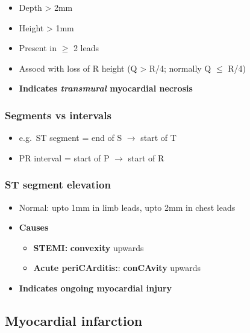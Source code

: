 \documentclass[
  12pt,
]{memoir}
\providecommand{\tightlist}{%
  \setlength{\itemsep}{0pt}\setlength{\parskip}{0pt}}
\begin{document}
\begin{itemize}
\tightlist
\item
  Depth \textgreater{} 2mm
\item
  Height \textgreater{} 1mm
\item
  Present in \(\ge\) 2 leads
\item
  Assocd with loss of R height (Q \textgreater{} R/4; normally Q \(\le\)
  R/4)
\item
  \textbf{Indicates \emph{transmural} myocardial necrosis}
\end{itemize}

\hypertarget{segments-vs-intervals}{%
\subsubsection{Segments vs intervals}\label{segments-vs-intervals}}

\begin{itemize}
\tightlist
\item
  e.g.~ST segment = end of S \(\rightarrow\) start of T
\item
  PR interval = start of P \(\rightarrow\) start of R
\end{itemize}

\hypertarget{st-segment-elevation}{%
\subsubsection{ST segment elevation}\label{st-segment-elevation}}

\begin{itemize}
\tightlist
\item
  Normal: upto 1mm in limb leads, upto 2mm in chest leads
\item
  \textbf{Causes}

  \begin{itemize}
  \tightlist
  \item
    \textbf{STEMI:} \textbf{convexity} upwards
  \item
    \textbf{Acute periCArditis:}: \textbf{conCAvity} upwards
  \end{itemize}
\item
  \textbf{Indicates ongoing myocardial injury}
\end{itemize}

\hypertarget{myocardial-infarction}{%
\subsection{Myocardial infarction}\label{myocardial-infarction}}
\end{document}
